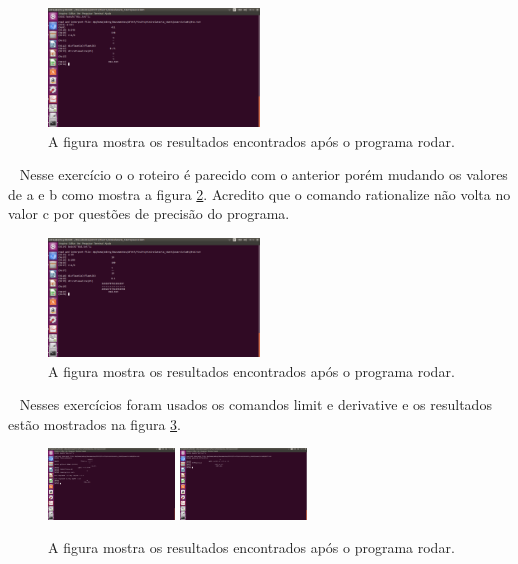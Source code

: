 \documentclass[a4wide]{report}
\begin{document}
\begin{figure}[h]
\centering
\includegraphics[width=0.50\textwidth]{01c.pdf}
\caption{A figura mostra os resultados encontrados após o programa rodar.}
\label{01c}
\end{figure}
\
 Nesse exercício o o roteiro é parecido com o anterior porém mudando os valores de a e b como mostra a figura \ref{01d}. Acredito que o comando rationalize não volta no valor c por questões de precisão do programa.

\begin{figure}[h]
\centering
\includegraphics[width=0.50\textwidth]{01d.pdf}
\caption{A figura mostra os resultados encontrados após o programa rodar.}
\label{01d}
\end{figure}
\
 Nesses exercícios foram usados os comandos limit e derivative e os resultados estão mostrados na figura \ref{01ef}.
\
\begin{figure}[h]
\centering
\includegraphics[width=0.30\textwidth]{01e.pdf}
\includegraphics[width=0.30\textwidth]{01f.pdf}
\caption{A figura mostra os resultados encontrados após o programa rodar.}
\label{01ef}
\end{figure}
\
\end{document}
